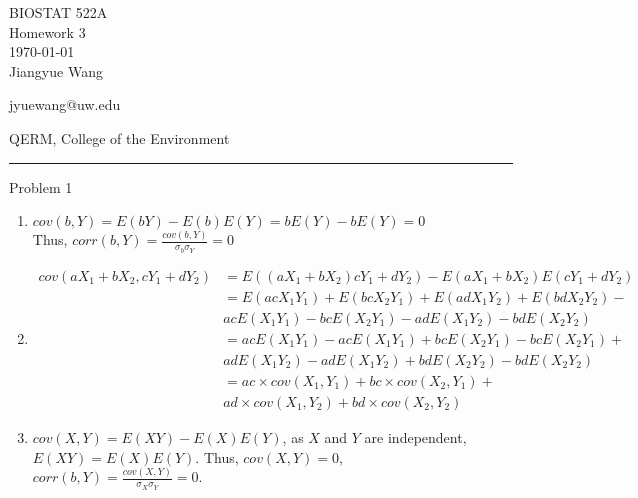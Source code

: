 \documentclass[12pt,letterpaper, onecolumn]{exam}
\begin{document}
\begingroup  
    \centering
    \LARGE BIOSTAT 522A\\
    \LARGE Homework 3\\[0.5em]
    \large \today\\[0.5em]
    \large Jiangyue Wang\par
    \large jyuewang@uw.edu\par
    \large QERM, College of the Environment\par
\endgroup
\rule{\textwidth}{0.4pt}
\pointsdroppedatright   %
\printanswers
\renewcommand{\solutiontitle}{\noindent\textbf{Ans:}\enspace}   %
\begin{questions}
    \question Problem 1
    \begin{solution}
    \begin{enumerate}
        \item $cov(b,Y) = E(bY) - E(b)E(Y) = bE(Y) - bE(Y) = 0$ \\
        Thus, $corr(b,Y) = \frac{cov(b,Y)}{\sigma_b\sigma_Y} = 0$
        \item \begin{align*}
             cov(aX_1+bX_2, cY_1+dY_2)& = E((aX_1+bX_2)cY_1+dY_2)-E(aX_1+bX_2)E(cY_1+dY_2) \\
            & = E(acX_1Y_1)+E(bcX_2Y_1)+E(adX_1Y_2)+E(bdX_2Y_2) - \\
            & acE(X_1Y_1)-bcE(X_2Y_1)-adE(X_1Y_2)-bdE(X_2Y_2) \\
            & = acE(X_1Y_1)-acE(X_1Y_1)+bcE(X_2Y_1)-bcE(X_2Y_1)+ \\ 
            & adE(X_1Y_2)-adE(X_1Y_2)+bdE(X_2Y_2)-bdE(X_2Y_2) \\
            & = ac \times cov(X_1,Y_1) + bc \times cov(X_2,Y_1) + \\
            & ad \times cov(X_1,Y_2) + bd \times cov(X_2,Y_2)
        \end{align*}
        \item $cov(X,Y) = E(XY)-E(X)E(Y)$, as $X$ and $Y$ are independent, $E(XY) = E(X)E(Y)$. Thus, $cov(X,Y) = 0$, $corr(b,Y) = \frac{cov(X,Y)}{\sigma_X\sigma_Y} = 0$.
    \end{enumerate}
    
    \end{solution}


\end{questions}
\end{document}
